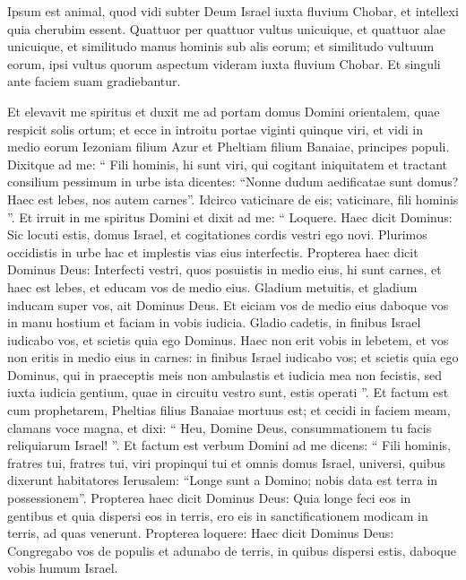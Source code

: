 \begin{biblechapter}
\begin{biblechapter}
\begin{biblechapter}
\begin{biblechapter}
\begin{biblechapter}
\begin{biblechapter}
\begin{biblechapter}
\begin{biblechapter}
\begin{biblechapter}
\begin{biblechapter}
\verse Ipsum est animal, quod vidi subter Deum Israel iuxta fluvium Chobar, et intellexi quia cherubim essent. 
\verse Quattuor per quattuor vultus unicuique, et quattuor alae unicuique, et similitudo manus hominis sub alis eorum; 
\verse et similitudo vultuum eorum, ipsi vultus quorum aspectum videram iuxta fluvium Chobar. Et singuli ante faciem suam gradiebantur.
 
\begin{biblechapter}
\verse Et elevavit me spiritus et duxit me ad portam domus Domini orientalem, quae respicit solis ortum; et ecce in introitu portae viginti quinque viri, et vidi in medio eorum Iezoniam filium Azur et Pheltiam filium Banaiae, principes populi. 
\verse Dixitque ad me: “ Fili hominis, hi sunt viri, qui cogitant iniquitatem et tractant consilium pessimum in urbe ista 
\verse dicentes: “Nonne dudum aedificatae sunt domus? Haec est lebes, nos autem carnes”. 
\verse Idcirco vaticinare de eis; vaticinare, fili hominis ”. 
\verse Et irruit in me spiritus Domini et dixit ad me: “ Loquere. Haec dicit Dominus: Sic locuti estis, domus Israel, et cogitationes cordis vestri ego novi. 
\verse Plurimos occidistis in urbe hac et implestis vias eius interfectis. 
\verse Propterea haec dicit Dominus Deus: Interfecti vestri, quos posuistis in medio eius, hi sunt carnes, et haec est lebes, et educam vos de medio eius. 
\verse Gladium metuitis, et gladium inducam super vos, ait Dominus Deus. 
\verse Et eiciam vos de medio eius daboque vos in manu hostium et faciam in vobis iudicia. 
\verse Gladio cadetis, in finibus Israel iudicabo vos, et scietis quia ego Dominus. 
\verse Haec non erit vobis in lebetem, et vos non eritis in medio eius in carnes: in finibus Israel iudicabo vos; 
\verse et scietis quia ego Dominus, qui in praeceptis meis non ambulastis et iudicia mea non fecistis, sed iuxta iudicia gentium, quae in circuitu vestro sunt, estis operati ”.
 \verse Et factum est cum prophetarem, Pheltias filius Banaiae mortuus est; et cecidi in faciem meam, clamans voce magna, et dixi: “ Heu, Domine Deus, consummationem tu facis reliquiarum Israel! ”.
 \verse Et factum est verbum Domini ad me dicens: 
\verse “ Fili hominis, fratres tui, fratres tui, viri propinqui tui et omnis domus Israel, universi, quibus dixerunt habitatores Ierusalem: “Longe sunt a Domino; nobis data est terra in possessionem”. 
\verse Propterea haec dicit Dominus Deus: Quia longe feci eos in gentibus et quia dispersi eos in terris, ero eis in sanctificationem modicam in terris, ad quas venerunt. 
\verse Propterea loquere: Haec dicit Dominus Deus: Congregabo vos de populis et adunabo de terris, in quibus dispersi estis, daboque vobis humum Israel. 

\end{biblechapter}
\end{biblechapter}
\end{biblechapter}
\end{biblechapter}
\end{biblechapter}
\end{biblechapter}
\end{biblechapter}
\end{biblechapter}
\end{biblechapter}
\end{biblechapter}
\end{biblechapter}
